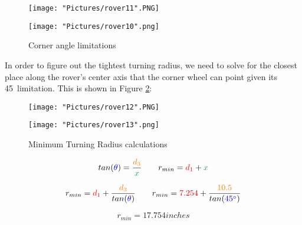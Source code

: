 \documentclass[12pt]{article}
\begin{document}
\begin{figure}[H]
 	\centering
  	\begin{minipage}[b]{0.45\textwidth}
		\texttt{[image: "Pictures/rover11".PNG]}
  	\end{minipage}
  	\hfill
  	\begin{minipage}[b]{0.45\textwidth}
    		\texttt{[image: "Pictures/rover10".png]}
  	\end{minipage}
  	\caption{Corner angle limitations}
	\label{r7}
\end{figure}

\noindent In order to figure out the tightest turning radius, we need to solve for the closest place along the rover's center axis that the corner wheel can point given its 45\degree\ limitation. This is shown in Figure \ref{r8}:

\begin{figure}[H]
 	\centering
  	\begin{minipage}[b]{0.45\textwidth}
		\texttt{[image: "Pictures/rover12".PNG]}
  	\end{minipage}
  	\hfill
  	\begin{minipage}[b]{0.45\textwidth}
    		\texttt{[image: "Pictures/rover13".png]}
  	\end{minipage}
  	\caption{Minimum Turning Radius calculations}
	\label{r8}
\end{figure}


\begin{equation}
	tan(\textcolor{blue}{\theta}) = \frac{\textcolor{orange}{d_3}}{\textcolor{ForestGreen}{x}} \qquad  r_{min} = \textcolor{red}{d_1} + \textcolor{ForestGreen}{x} 
	\label{eq4}
\end{equation}

\begin{equation}
	r_{min} = \textcolor{red}{d_1} + \frac{\textcolor{orange}{d_3}}{tan(\textcolor{blue}{\theta})} \qquad   r_{min} = \textcolor{red}{7.254} + \frac{\textcolor{orange}{10.5}}{tan(\textcolor{blue}{45\degree})}
\end{equation}

\begin{equation}
	r_{min} = 17.754 inches
\end{equation}
\end{document}
